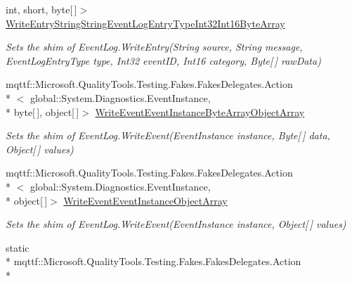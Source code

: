 \begin{DoxyCompactItemize}
int, short, byte\mbox{[}$\,$\mbox{]}$>$ \hyperlink{class_system_1_1_diagnostics_1_1_fakes_1_1_shim_event_log_ab8ecba0affefe2d47b4513812d79e156}{Write\-Entry\-String\-String\-Event\-Log\-Entry\-Type\-Int32\-Int16\-Byte\-Array}
\begin{DoxyCompactList}\small\item\em Sets the shim of Event\-Log.\-Write\-Entry(\-String source, String message, Event\-Log\-Entry\-Type type, Int32 event\-I\-D, Int16 category, Byte\mbox{[}$\,$\mbox{]} raw\-Data)\end{DoxyCompactList}\item 
mqttf\-::\-Microsoft.\-Quality\-Tools.\-Testing.\-Fakes.\-Fakes\-Delegates.\-Action\\*
$<$ global\-::\-System.\-Diagnostics.\-Event\-Instance, \\*
byte\mbox{[}$\,$\mbox{]}, object\mbox{[}$\,$\mbox{]}$>$ \hyperlink{class_system_1_1_diagnostics_1_1_fakes_1_1_shim_event_log_ae82a6befe22f94cb6079f5b540b7d8a1}{Write\-Event\-Event\-Instance\-Byte\-Array\-Object\-Array}
\begin{DoxyCompactList}\small\item\em Sets the shim of Event\-Log.\-Write\-Event(\-Event\-Instance instance, Byte\mbox{[}$\,$\mbox{]} data, Object\mbox{[}$\,$\mbox{]} values)\end{DoxyCompactList}\item 
mqttf\-::\-Microsoft.\-Quality\-Tools.\-Testing.\-Fakes.\-Fakes\-Delegates.\-Action\\*
$<$ global\-::\-System.\-Diagnostics.\-Event\-Instance, \\*
object\mbox{[}$\,$\mbox{]}$>$ \hyperlink{class_system_1_1_diagnostics_1_1_fakes_1_1_shim_event_log_aefdf35f7063e20903ae8000cdd12448c}{Write\-Event\-Event\-Instance\-Object\-Array}
\begin{DoxyCompactList}\small\item\em Sets the shim of Event\-Log.\-Write\-Event(\-Event\-Instance instance, Object\mbox{[}$\,$\mbox{]} values)\end{DoxyCompactList}\item 
static \\*
mqttf\-::\-Microsoft.\-Quality\-Tools.\-Testing.\-Fakes.\-Fakes\-Delegates.\-Action\\*

\end{DoxyCompactItemize}
